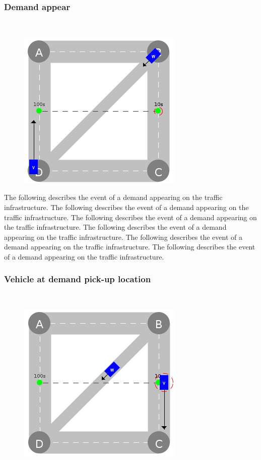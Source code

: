 \documentclass[graybox]{svmult}
\begin{document}
\subsubsection{Demand appear}
\
\begin{figure}
	\centering
		\includegraphics[scale=0.35]{../../events/demand.png}
\end{figure}

The following describes the event of a demand appearing on the traffic infrastructure.
The following describes the event of a demand appearing on the traffic infrastructure.
The following describes the event of a demand appearing on the traffic infrastructure.
The following describes the event of a demand appearing on the traffic infrastructure.
The following describes the event of a demand appearing on the traffic infrastructure.
The following describes the event of a demand appearing on the traffic infrastructure.

\subsubsection{Vehicle at demand pick-up location}
\
\begin{figure}
	\centering
		\includegraphics[scale=0.35]{../../events/vehicle-at-demand-pick-up.png}
\end{figure}
\end{document}
